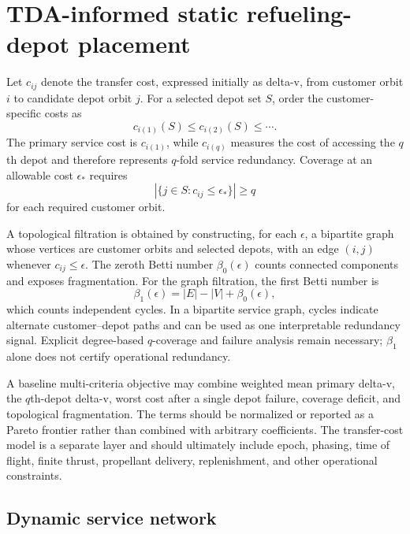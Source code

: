 \documentclass[11pt]{article}
\begin{document}
\section{TDA-informed static refueling-depot placement}

Let $c_{ij}$ denote the transfer cost, expressed initially as delta-v, from
customer orbit $i$ to candidate depot orbit $j$. For a selected depot set
$S$, order the customer-specific costs as
\begin{equation}
  c_{i(1)}(S)\leq c_{i(2)}(S)\leq\cdots.
\end{equation}
The primary service cost is $c_{i(1)}$, while $c_{i(q)}$ measures the cost of
accessing the $q$th depot and therefore represents $q$-fold service redundancy.
Coverage at an allowable cost $\epsilon_*$ requires
\begin{equation}
  \left|\{j\in S:c_{ij}\leq\epsilon_*\}\right|\geq q
\end{equation}
for each required customer orbit.

A topological filtration is obtained by constructing, for each $\epsilon$, a
bipartite graph whose vertices are customer orbits and selected depots, with an
edge $(i,j)$ whenever $c_{ij}\leq\epsilon$. The zeroth Betti number
$\beta_0(\epsilon)$ counts connected components and exposes fragmentation. For
the graph filtration, the first Betti number is
\begin{equation}
  \beta_1(\epsilon)=|E|-|V|+\beta_0(\epsilon),
\end{equation}
which counts independent cycles. In a bipartite service graph, cycles indicate
alternate customer--depot paths and can be used as one interpretable redundancy
signal. Explicit degree-based $q$-coverage and failure analysis remain necessary;
$\beta_1$ alone does not certify operational redundancy.

A baseline multi-criteria objective may combine weighted mean primary delta-v,
the $q$th-depot delta-v, worst cost after a single depot failure, coverage
deficit, and topological fragmentation. The terms should be normalized or
reported as a Pareto frontier rather than combined with arbitrary coefficients.
The transfer-cost model is a separate layer and should ultimately include
epoch, phasing, time of flight, finite thrust, propellant delivery, replenishment,
and other operational constraints.

\subsection{Dynamic service network}
\end{document}

